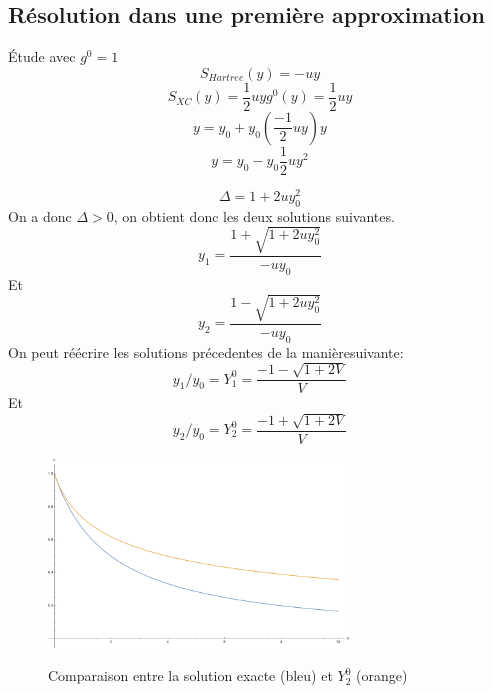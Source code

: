 \documentclass{beamer}
\begin{document}
\subsection{R\'esolution dans une premi\`ere approximation}
\begin{frame}
 \'Etude avec $g^0 = 1$
\begin{equation}
 S_{Hartree}(y) = -uy
\end{equation}
 \begin{equation}
 S_{XC}(y) = \frac{1}{2} u y g^0(y) = \frac{1}{2} u y
\end{equation}
\begin{equation}
 y = y_0 + y_0 (\frac{-1}{2} u y) y
\end{equation}
\begin{equation}
 y = y_0 - y_0 \frac{1}{2} u y^2
\end{equation}
\end{frame}


\begin{frame}
 \begin{equation}
 \Delta = 1 + 2 u y_0^2
\end{equation}
On a donc $\Delta > 0 $, on obtient donc les deux solutions suivantes.
\begin{equation}
 y_1 = \frac{1 + \sqrt{1 + 2 u y_0 ^2}}{- u y_0}
\end{equation}
Et 
\begin{equation}
 y_2 = \frac{1 - \sqrt{1 + 2 u y_0^2}}{- u y_0}
\end{equation}
On peut r\'e\'ecrire les solutions pr\'ecedentes de la mani\`eresuivante:
\begin{equation}
 y_1/y_0 = Y^0_1 = \frac{-1-\sqrt{1 + 2 V}}{V}
\end{equation}
Et 
\begin{equation}
 y_2/y_0 = Y^0_2 = \frac{-1 + \sqrt{1 + 2V}}{V}
\end{equation}
\end{frame}

\begin{frame}
\begin{figure}
\caption{Comparaison entre la solution exacte (bleu) et $Y^0_2$ (orange)}
\includegraphics[width = 80mm]{CourbesPhys2.png}
\label{solb}
\end{figure}
\end{frame}
\end{document}
